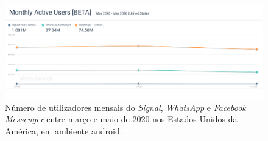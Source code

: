 \begin{figure}[H]
   \begin{center}
       \includegraphics[width=17cm]{img/Monthly Active Users [BETA] (2020_06_10_2020_06_10).png}
       \caption{Número de utilizadores mensais do \textit{Signal}, \textit{WhatsApp} e \textit{Facebook Messenger} entre março e maio de 2020 nos Estados Unidos da América, em ambiente android. \cite{all_monthly_users}}
       \label{graph:all_monthly_active}
   \end{center}
\end{figure}

